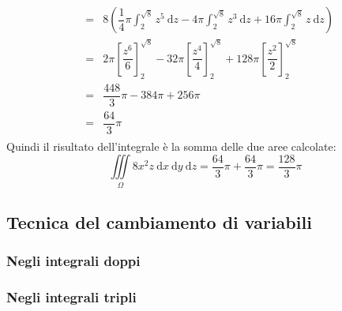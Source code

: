 \documentclass[a4paper]{article}
\begin{document}
\begin{gather*}
\begin{array}{rcl}
			&=&
			8\left(\dfrac{1}{4}\pi\displaystyle\int_{2}^{\sqrt{8}} z^{5} \:\mathrm{d}z - 4\pi\int_{2}^{\sqrt{8}} z^{3} \:\mathrm{d}z + 16\pi\int_{2}^{\sqrt{8}} z \:\mathrm{d}z\right) \\ [1.5em]
			&=&
			2\pi\left[\dfrac{z^{6}}{6}\right]_{2}^{\sqrt{8}} - 32\pi\left[\dfrac{z^{4}}{4}\right]_{2}^{\sqrt{8}} + 128\pi\left[\dfrac{z^{2}}{2}\right]_{2}^{\sqrt{8}} \\ [1.5em]
			&=&
			\dfrac{448}{3}\pi - 384\pi + 256\pi \\ [1em]
			&=&
			\dfrac{64}{3}\pi
		\end{array}
	\end{gather*}
	Quindi il risultato dell'integrale è la somma delle due aree calcolate:
	\begin{equation*}
		\displaystyle\iiint\limits_{\Omega} 8x^{2}z \:\mathrm{d}x\:\mathrm{d}y\:\mathrm{d}z = \dfrac{64}{3}\pi + \dfrac{64}{3}\pi = \dfrac{128}{3}\pi
	\end{equation*}

	\newpage

	\subsection{Tecnica del cambiamento di variabili}

	\newpage

	\subsubsection{Negli integrali doppi}

	\newpage

	\subsubsection{Negli integrali tripli}



\end{document}
